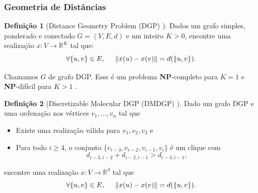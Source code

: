 \documentclass[10pt]{beamer}
\theoremstyle{plain}
\theoremstyle{definition}
\newtheorem{definicao}{Definição}[section]
\begin{document}
	\begin{frame}
		\frametitle{\normalsize Geometria de Distâncias} 
		{
			\small
			\begin{definicao}[Distance Geometry Problem (DGP) \cite{carlileGDandAplications}]
				Dados um grafo simples, ponderado e conectado $G = (V, E, d)$ e um inteiro $K>0$, encontre uma realização $x: V \longrightarrow \mathbb{R}^K$ tal que:
				\begin{equation*}
					\forall \{u,v\} \in E, \hspace{0.5cm} \lVert x(u) - x(v) \rVert = d(\{u,v\}). \label{eq:DGP}
				\end{equation*}	
			\end{definicao}
		
			Chamamos $G$ de grafo DGP. Esse é um problema \textbf{NP}-completo para $K = 1$ e \textbf{NP}-difícil para $K>1$ \cite{Saxe:79}.
			\\
			
			\begin{definicao}[Discretizable Molecular DGP (DMDGP) \cite{carlile:MinimalOrder}]
				Dado um grafo DGP e uma ordenação nos vértices $v_1,\dots,v_n$ tal que
				\begin{itemize}
					\item Existe uma realização válida para $v_1, v_2, v_3$ e
					\item Para todo $i \geq 4$, o conjunto $\{v_{i-3}, v_{i-2}, v_{i-1}, v_i\}$ é um clique com $$d_{i-3,i-2} + d_{i-2,i-1} > d_{i-3,i-1},$$
				\end{itemize}
				encontre uma realização $x: V \longrightarrow \mathbb{R}^3$ tal que 
				$$\forall \{u,v\} \in E, \hspace{0.5cm} \lVert x(u) - x(v) \rVert = d(\{u,v\}).$$
			\end{definicao}
			}	
	\end{frame}
	
\end{document}
